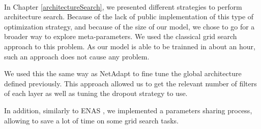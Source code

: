 \paragraph{}
In Chapter \ref{architectureSearch}, we presented different strategies to perform architecture search. Because of the lack of public implementation of this type of optimization strategy, and because of the size of our model, we chose to go for a broader way to explore meta-parameters. We used the classical grid search approach to this problem. As our model is able to be trainned in about an hour, such an approach does not cause any problem.

We used this the same way as NetAdapt \cite{yang2018netadapt} to fine tune the global architecture defined previously. This approach allowed us to get the relevant number of filters of each layer as well as tuning the dropout strategy to use.

In addition, similarly to ENAS \cite{pham2018efficient}, we implemented a parameters sharing process, allowing to save a lot of time on some grid search tasks.

